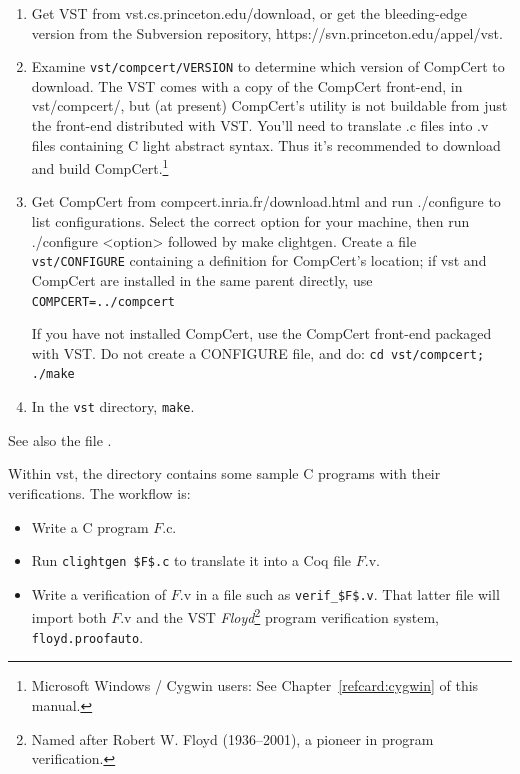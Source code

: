 \documentclass[12pt,fleqn,openany,oneside,showtrims]{memoir}
\begin{document}
\begin{enumerate}\setlength\itemsep{0pt}
\item  Get VST from \textsf{vst.cs.princeton.edu/download},
or get the bleeding-edge version from the Subversion repository,\newline
\textsf{https://svn.princeton.edu/appel/vst}.
\item Examine \lstinline{vst/compcert/VERSION} to determine which
version of CompCert to download.
The VST comes with a copy of the CompCert front-end, in vst/compcert/,
but (at present) CompCert's  utility is not buildable
from just the front-end distributed with VST.  You'll need 
to translate .c files into .v files containing C light abstract syntax.
Thus it's recommended to download
and build CompCert.\footnote{Microsoft Windows / Cygwin users: 
See Chapter~\ref{refcard:cygwin} of this manual.}

\item Get CompCert from \textsf{compcert.inria.fr/download.html}
and run \textsf{./configure} to list configurations. Select the correct option
for your machine, then run \textsf{./configure <option>} followed by \newline
\textsf{make clightgen}.
Create a file \lstinline{vst/CONFIGURE} containing a definition for CompCert's location;
if vst and CompCert are installed in the same
parent directly, use \lstinline{COMPCERT=../compcert}

If you have  not installed CompCert,
use the CompCert front-end packaged with VST.
Do not create a CONFIGURE file, and do:\newline
\lstinline{cd vst/compcert; ./make}  

\item In the \lstinline{vst} directory, \lstinline{make}.
\end{enumerate}
See also the file .

Within vst, the  directory contains some sample C programs
with their verifications.  The workflow is:
\begin{itemize}
\item Write a C program $F$.c.
\item Run \lstinline{clightgen $F$.c} to translate it into a Coq
file $F$.v.
\item Write a verification of $F$.v in a file such as
\lstinline{verif_$F$.v}.  That latter file will import
both $F$.v and the VST \emph{Floyd}\footnote{Named after Robert W. Floyd (1936--2001), a pioneer in program verification.} program verification system,
\lstinline{floyd.proofauto}.
\end{itemize}
\end{document}
